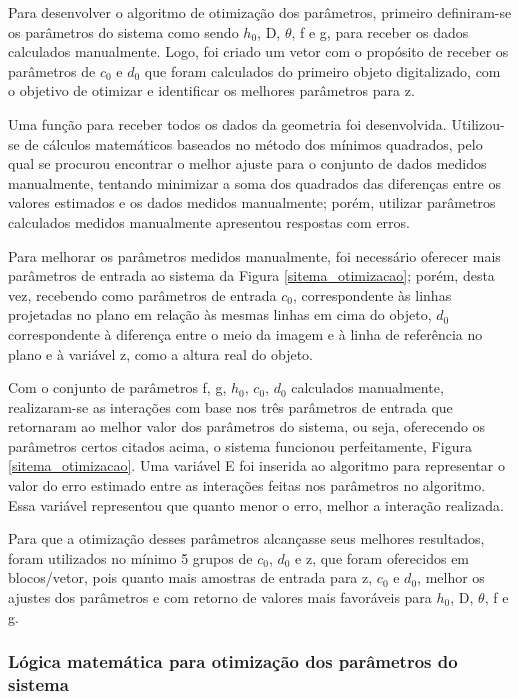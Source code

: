 \documentclass[a4paper, 12pt]{article}
\begin{document}
Para desenvolver o algoritmo de otimização dos parâmetros, primeiro definiram-se os parâmetros do sistema como sendo $h_0$, D, $\theta$, f e g, para receber os dados calculados manualmente. Logo, foi criado um vetor com o propósito de receber os parâmetros de $c_0$ e $d_0$ que foram calculados do primeiro objeto digitalizado, com o objetivo de otimizar e identificar os melhores parâmetros para z.

Uma função para receber todos os dados da geometria foi desenvolvida. Utilizou-se de cálculos matemáticos baseados no método dos mínimos quadrados, pelo qual se procurou encontrar o melhor ajuste para o conjunto de dados medidos manualmente, tentando minimizar a soma dos quadrados das diferenças entre os valores estimados e os dados medidos manualmente; porém, utilizar parâmetros calculados medidos manualmente apresentou respostas com erros.

Para melhorar os parâmetros medidos manualmente, foi necessário oferecer mais parâmetros de entrada ao sistema da Figura \ref{sitema_otimizacao}; porém, desta vez, recebendo como parâmetros de entrada $c_0$, correspondente às linhas projetadas no plano em relação às mesmas linhas em cima do objeto, $d_0$ correspondente à diferença entre o meio da imagem e à linha de referência no plano e à variável z, como a altura real do objeto.

Com o conjunto de parâmetros f, g, $h_0$, $c_0$, $d_0$ calculados manualmente, realizaram-se as interações com base nos três parâmetros de entrada que retornaram ao melhor valor dos parâmetros do sistema, ou seja, oferecendo os parâmetros certos citados acima, o sistema funcionou perfeitamente, Figura \ref{sitema_otimizacao}. Uma variável E foi inserida ao algoritmo para representar o valor do erro estimado entre as interações feitas nos parâmetros no algoritmo. Essa variável representou que quanto menor o erro, melhor a interação realizada.

Para que a otimização desses parâmetros alcançasse seus melhores resultados, foram utilizados no mínimo 5 grupos de $c_0$, $d_0$ e z, que foram oferecidos em blocos/vetor, pois quanto mais amostras de entrada para z, $c_0$ e $d_0$, melhor os ajustes dos parâmetros e com retorno de valores mais favoráveis para $h_0$, D, $\theta$, f e g. 

\subsubsection{Lógica matemática para otimização dos parâmetros do sistema}
\end{document}
